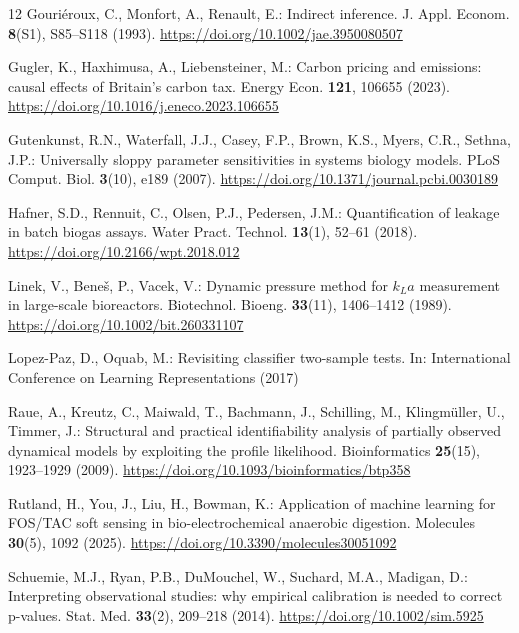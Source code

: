 \documentclass[runningheads]{llncs}
\begin{document}
\begin{thebibliography}{12}
Gouri\'{e}roux, C., Monfort, A., Renault, E.: Indirect inference.
J. Appl. Econom. \textbf{8}(S1), S85--S118 (1993).
\url{https://doi.org/10.1002/jae.3950080507}

Gugler, K., Haxhimusa, A., Liebensteiner, M.: Carbon pricing and
emissions: causal effects of Britain's carbon tax. Energy Econ.
\textbf{121}, 106655 (2023).
\url{https://doi.org/10.1016/j.eneco.2023.106655}

Gutenkunst, R.N., Waterfall, J.J., Casey, F.P., Brown, K.S., Myers,
C.R., Sethna, J.P.: Universally sloppy parameter sensitivities in
systems biology models. PLoS Comput. Biol. \textbf{3}(10), e189 (2007).
\url{https://doi.org/10.1371/journal.pcbi.0030189}

Hafner, S.D., Rennuit, C., Olsen, P.J., Pedersen, J.M.: Quantification
of leakage in batch biogas assays. Water Pract. Technol.
\textbf{13}(1), 52--61 (2018).
\url{https://doi.org/10.2166/wpt.2018.012}

Linek, V., Bene\v{s}, P., Vacek, V.: Dynamic pressure method for
$k_{L}a$ measurement in large-scale bioreactors. Biotechnol. Bioeng.
\textbf{33}(11), 1406--1412 (1989).
\url{https://doi.org/10.1002/bit.260331107}

Lopez-Paz, D., Oquab, M.: Revisiting classifier two-sample tests. In:
International Conference on Learning Representations (2017)

Raue, A., Kreutz, C., Maiwald, T., Bachmann, J., Schilling, M.,
Klingm\"{u}ller, U., Timmer, J.: Structural and practical
identifiability analysis of partially observed dynamical models by
exploiting the profile likelihood. Bioinformatics \textbf{25}(15),
1923--1929 (2009).
\url{https://doi.org/10.1093/bioinformatics/btp358}

Rutland, H., You, J., Liu, H., Bowman, K.: Application of machine learning
for FOS/TAC soft sensing in bio-electrochemical anaerobic digestion.
Molecules \textbf{30}(5), 1092 (2025).
\url{https://doi.org/10.3390/molecules30051092}

Schuemie, M.J., Ryan, P.B., DuMouchel, W., Suchard, M.A., Madigan, D.:
Interpreting observational studies: why empirical calibration is needed
to correct p-values. Stat. Med. \textbf{33}(2), 209--218 (2014).
\url{https://doi.org/10.1002/sim.5925}


\end{thebibliography}
\end{document}
